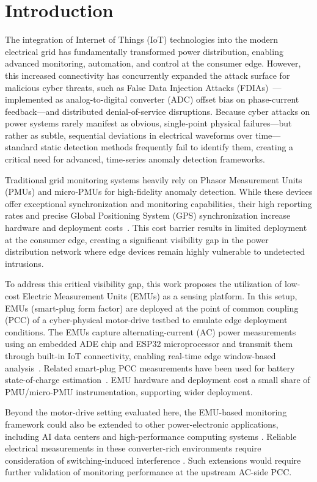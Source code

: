 \documentclass[conference,letterpaper]{IEEEtran}
\begin{document}
\section{Introduction}
The integration of Internet of Things (IoT) technologies into the modern electrical grid has fundamentally transformed power distribution, enabling advanced monitoring, automation, and control at the consumer edge. However, this increased connectivity has concurrently expanded the attack surface for malicious cyber threats, such as False Data Injection Attacks (FDIAs)~\cite{liu2009}---implemented as analog-to-digital converter (ADC) offset bias on phase-current feedback---and distributed denial-of-service disruptions. Because cyber attacks on power systems rarely manifest as obvious, single-point physical failures---but rather as subtle, sequential deviations in electrical waveforms over time---standard static detection methods frequently fail to identify them, creating a critical need for advanced, time-series anomaly detection frameworks.

Traditional grid monitoring systems heavily rely on Phasor Measurement Units (PMUs) and micro-PMUs for high-fidelity anomaly detection. While these devices offer exceptional synchronization and monitoring capabilities, their high reporting rates and precise Global Positioning System (GPS) synchronization increase hardware and deployment costs~\cite{vonmeier2017}. This cost barrier results in limited deployment at the consumer edge, creating a significant visibility gap in the power distribution network where edge devices remain highly vulnerable to undetected intrusions.

To address this critical visibility gap, this work proposes the utilization of low-cost Electric Measurement Units (EMUs) as a sensing platform. In this setup, EMUs (smart-plug form factor) are deployed at the point of common coupling (PCC) of a cyber-physical motor-drive testbed to emulate edge deployment conditions. The EMUs capture alternating-current (AC) power measurements using an embedded ADE chip and ESP32 microprocessor and transmit them through built-in IoT connectivity, enabling real-time edge window-based analysis~\cite{najarEMU2026}. Related smart-plug PCC measurements have been used for battery state-of-charge estimation~\cite{najarSOC2026}. EMU hardware and deployment cost a small share of PMU/micro-PMU instrumentation, supporting wider deployment.

Beyond the motor-drive setting evaluated here, the EMU-based monitoring framework could also be extended to other power-electronic applications, including AI data centers and high-performance computing systems \cite{Habibi2026DataCenters,Lotfi2026FCML}.
Reliable electrical measurements in these converter-rich environments require consideration of switching-induced interference \cite{Omidi2026HybridSensor}.
Such extensions would require further validation of monitoring performance at the upstream AC-side PCC.
\end{document}
